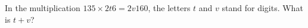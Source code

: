 In the multiplication $135\times2t6=2v160$, the letters $t$ and $v$ stand for digits. What is $t+v$?
